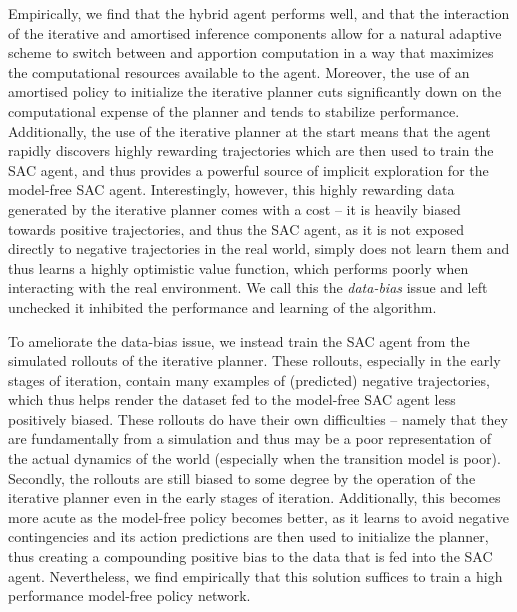 Empirically, we find that the hybrid agent performs well, and that the interaction of the iterative and amortised inference components allow for a natural adaptive scheme to switch between and apportion computation in a way that maximizes the computational resources available to the agent. Moreover, the use of an amortised policy to initialize the iterative planner cuts significantly down on the computational expense of the planner and tends to stabilize performance. Additionally, the use of the iterative planner at the start means that the agent rapidly discovers highly rewarding trajectories which are then used to train the SAC agent, and thus provides a powerful source of implicit exploration for the model-free SAC agent. Interestingly, however, this highly rewarding data generated by the iterative planner comes with a cost -- it is heavily biased towards positive trajectories, and thus the SAC agent, as it is not exposed directly to negative trajectories in the real world, simply does not learn them and thus learns a highly optimistic value function, which performs poorly when interacting with the real environment. We call this the \emph{data-bias} issue and left unchecked it inhibited the performance and learning of the algorithm.

To ameliorate the data-bias issue, we instead train the SAC agent from the simulated rollouts of the iterative planner. These rollouts, especially in the early stages of iteration, contain many examples of (predicted) negative trajectories, which thus helps render the dataset fed to the model-free SAC agent less positively biased. These rollouts do have their own difficulties -- namely that they are fundamentally from a simulation and thus may be a poor representation of the actual dynamics of the world (especially when the transition model is poor). Secondly, the rollouts are still biased to some degree by the operation of the iterative planner even in the early stages of iteration. Additionally, this becomes more acute as the model-free policy becomes better, as it learns to avoid negative contingencies and its action predictions are then used to initialize the planner, thus creating a compounding positive bias to the data that is fed into the SAC agent. Nevertheless, we find empirically that this solution suffices to train a high performance model-free policy network.


